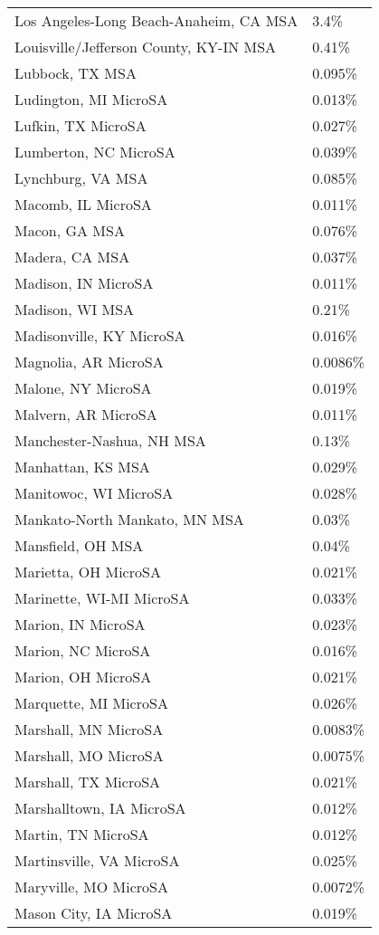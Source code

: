 \begin{longtable}[]{@{}ll@{}}
Los Angeles-Long Beach-Anaheim, CA MSA & 3.4\% \\
Louisville/Jefferson County, KY-IN MSA & 0.41\% \\
Lubbock, TX MSA & 0.095\% \\
Ludington, MI MicroSA & 0.013\% \\
Lufkin, TX MicroSA & 0.027\% \\
Lumberton, NC MicroSA & 0.039\% \\
Lynchburg, VA MSA & 0.085\% \\
Macomb, IL MicroSA & 0.011\% \\
Macon, GA MSA & 0.076\% \\
Madera, CA MSA & 0.037\% \\
Madison, IN MicroSA & 0.011\% \\
Madison, WI MSA & 0.21\% \\
Madisonville, KY MicroSA & 0.016\% \\
Magnolia, AR MicroSA & 0.0086\% \\
Malone, NY MicroSA & 0.019\% \\
Malvern, AR MicroSA & 0.011\% \\
Manchester-Nashua, NH MSA & 0.13\% \\
Manhattan, KS MSA & 0.029\% \\
Manitowoc, WI MicroSA & 0.028\% \\
Mankato-North Mankato, MN MSA & 0.03\% \\
Mansfield, OH MSA & 0.04\% \\
Marietta, OH MicroSA & 0.021\% \\
Marinette, WI-MI MicroSA & 0.033\% \\
Marion, IN MicroSA & 0.023\% \\
Marion, NC MicroSA & 0.016\% \\
Marion, OH MicroSA & 0.021\% \\
Marquette, MI MicroSA & 0.026\% \\
Marshall, MN MicroSA & 0.0083\% \\
Marshall, MO MicroSA & 0.0075\% \\
Marshall, TX MicroSA & 0.021\% \\
Marshalltown, IA MicroSA & 0.012\% \\
Martin, TN MicroSA & 0.012\% \\
Martinsville, VA MicroSA & 0.025\% \\
Maryville, MO MicroSA & 0.0072\% \\
Mason City, IA MicroSA & 0.019\% \\

\end{longtable}

